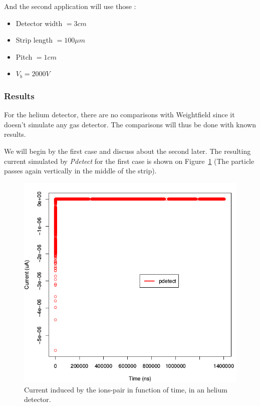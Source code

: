 \documentclass[11pt]{article}
\begin{document}
			And the second application will use those :

			\begin{itemize}

				\item Detector width $= 3 cm$
				\item Strip length $= 100 \mu m$
				\item Pitch $= 1 cm$
				\item $V_b = 2000 V$

			\end{itemize}

		\subsubsection*{Results}

			For the helium detector, there are no comparisons with Weightfield since it doesn't simulate
			any gas detector. The comparisons will thus be done with known results.

			We will begin by the first case and discuss about the second later.
			The resulting current simulated by \textit{Pdetect} for the first case is shown on
			Figure~\ref{fig:helium1_unprecise} (The particle passes again vertically in the middle of
			the strip).

			\begin{figure}[H]
			  \center
			  \includegraphics[scale=0.5]{images/applications/helium1_unprecise.png}
			  \caption{Current induced by the ions-pair in function of time, in an helium detector.}
			  \label{fig:helium1_unprecise}
			\end{figure}
\end{document}
